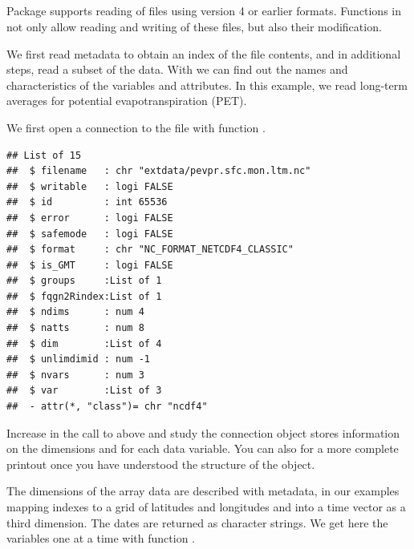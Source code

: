 \documentclass[krantz2]{krantz}\usepackage{knitr}
\begin{document}
\subsection[ncdf4]{}



Package  supports reading of files using  version 4 or earlier formats. Functions in  not only allow reading and writing of these files, but also their modification.

We first read metadata to obtain an index of the file contents, and in additional steps, read a subset of the data. With  we can find out the names and characteristics of the variables and attributes. In this example, we read long-term averages for potential evapotranspiration (PET).

We first open a connection to the file with function .

\begin{knitrout}\footnotesize
{}\color{fgcolor}\begin{kframe}
\begin{alltt}
 \hlkwb{<-} \hlstd{(}\hlstd{)}
  \hlstd{=} \hlstd{)}
\end{alltt}
\begin{verbatim}
## List of 15
##  $ filename   : chr "extdata/pevpr.sfc.mon.ltm.nc"
##  $ writable   : logi FALSE
##  $ id         : int 65536
##  $ error      : logi FALSE
##  $ safemode   : logi FALSE
##  $ format     : chr "NC_FORMAT_NETCDF4_CLASSIC"
##  $ is_GMT     : logi FALSE
##  $ groups     :List of 1
##  $ fqgn2Rindex:List of 1
##  $ ndims      : num 4
##  $ natts      : num 8
##  $ dim        :List of 4
##  $ unlimdimid : num -1
##  $ nvars      : num 3
##  $ var        :List of 3
##  - attr(*, "class")= chr "ncdf4"
\end{verbatim}
\end{kframe}
\end{knitrout}

\begin{advplayground}
Increase  in the call to  above and study the connection object stores information on the dimensions and for each data variable. You can also  for a more complete printout once you have understood the structure of the object.
\end{advplayground}
The dimensions of the array data are described with metadata, in our examples mapping indexes to a grid of latitudes and longitudes and into a time vector as a third dimension. The dates are returned as character strings. We get here the variables one at a time with function .
\end{document}
